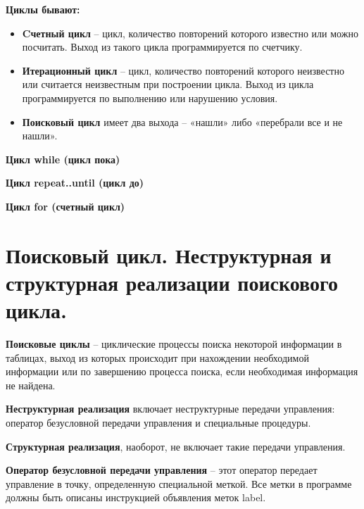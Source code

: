 {\bf{Циклы бывают:}} 
\begin{itemize}
\item {\bf{Cчетный цикл}} – цикл, количество повторений которого известно или можно посчитать. Выход из такого цикла программируется по счетчику.

\item {\bf{Итерационный цикл}} – цикл, количество повторений которого неизвестно или считается неизвестным при построении цикла. 
Выход из цикла программируется по выполнению или нарушению условия.

\item {\bf{Поисковый цикл}} имеет два выхода – «нашли» либо «перебрали все и не нашли».
\end{itemize}

{\bf{Цикл while (цикл пока)}}


{\bf{Цикл repeat..until (цикл до)}}


{\bf{Цикл for (счетный цикл)}}






\newpage\section{Поисковый цикл. Неструктурная и структурная реализации поискового цикла. }

\begin{myquote}
\end{myquote}

{\bf{Поисковые циклы}} – циклические процессы поиска некоторой информации в таблицах, выход из которых происходит при нахождении необходимой информации или по завершению процесса поиска, если необходимая информация не найдена.

{\bf{Неструктурная реализация}} включает неструктурные передачи управления: оператор безусловной передачи управления и специальные процедуры.

{\bf{Структурная реализация}}, наоборот, не включает такие передачи управления.

{\bf{Оператор безусловной передачи управления}} – этот оператор передает управление в точку, определенную специальной меткой.
Все метки в программе должны быть описаны инструкцией объявления меток label. 

